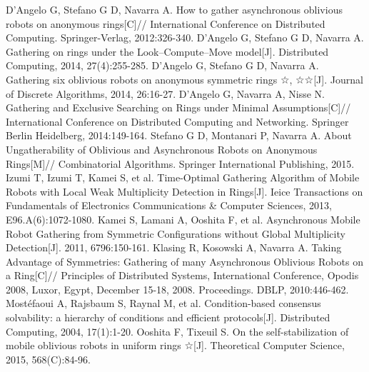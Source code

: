 \begin{thebibliography}{0}
   D'Angelo G, Stefano G D, Navarra A. How to gather asynchronous oblivious robots on anonymous rings[C]// International Conference on Distributed Computing. Springer-Verlag, 2012:326-340.
   D’Angelo G, Stefano G D, Navarra A. Gathering on rings under the Look–Compute–Move model[J]. Distributed Computing, 2014, 27(4):255-285.
   D'Angelo G, Stefano G D, Navarra A. Gathering six oblivious robots on anonymous symmetric rings ☆, ☆☆[J]. Journal of Discrete Algorithms, 2014, 26:16-27.
   D’Angelo G, Navarra A, Nisse N. Gathering and Exclusive Searching on Rings under Minimal Assumptions[C]// International Conference on Distributed Computing and Networking. Springer Berlin Heidelberg, 2014:149-164.
   Stefano G D, Montanari P, Navarra A. About Ungatherability of Oblivious and Asynchronous Robots on Anonymous Rings[M]// Combinatorial Algorithms. Springer International Publishing, 2015.
   Izumi T, Izumi T, Kamei S, et al. Time-Optimal Gathering Algorithm of Mobile Robots with Local Weak Multiplicity Detection in Rings[J]. Ieice Transactions on Fundamentals of Electronics Communications & Computer Sciences, 2013, E96.A(6):1072-1080.
   Kamei S, Lamani A, Ooshita F, et al. Asynchronous Mobile Robot Gathering from Symmetric Configurations without Global Multiplicity Detection[J]. 2011, 6796:150-161.
   Klasing R, Kosowski A, Navarra A. Taking Advantage of Symmetries: Gathering of many Asynchronous Oblivious Robots on a Ring[C]// Principles of Distributed Systems, International Conference, Opodis 2008, Luxor, Egypt, December 15-18, 2008. Proceedings. DBLP, 2010:446-462.
   Mostéfaoui A, Rajsbaum S, Raynal M, et al. Condition-based consensus solvability: a hierarchy of conditions and efficient protocols[J]. Distributed Computing, 2004, 17(1):1-20.
   Ooshita F, Tixeuil S. On the self-stabilization of mobile oblivious robots in uniform rings ☆[J]. Theoretical Computer Science, 2015, 568(C):84-96.
       
\end{thebibliography}
